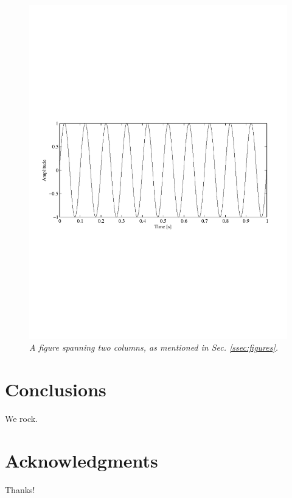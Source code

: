 \documentclass[twoside,a4paper]{article}
\begin{document}
\begin{figure}[ht]
\centerline{\includegraphics[width=5in,bb= 3 257 607 534]{TwoColumnSine2}} %
\caption{\label{ftt_plot2}{\it A figure spanning two columns, as mentioned in Sec. \ref{ssec:figures}. }}
\end{figure} %




\section{Conclusions}
We rock.



\section{Acknowledgments}
Thanks!




\end{document}
